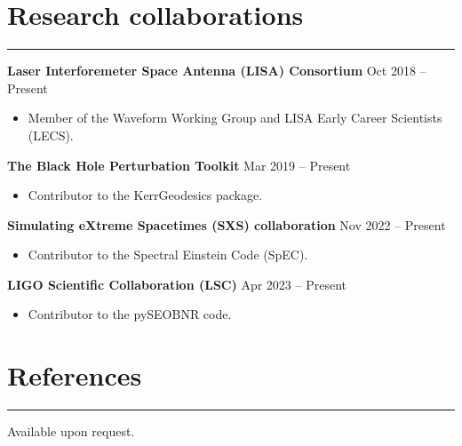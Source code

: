 \documentclass[10.5pt, oneside]{article}   	%
\begin{document}

{\color{Sectioncolour}
\section*{Research collaborations}
\vspace{-3mm}
\noindent\rule{\linewidth}{0.6pt}}
{\bf Laser Interforemeter Space Antenna (LISA) Consortium}  \hfill Oct 2018 -- Present \\
\vspace{-5mm}
\begin{itemize}
\item Member of the Waveform Working Group and LISA Early Career Scientists (LECS).
\end{itemize} 
{\bf The Black Hole Perturbation Toolkit}  \hfill Mar 2019 -- Present \\
\vspace{-5mm}
\begin{itemize}
\item Contributor to the KerrGeodesics package.
\end{itemize}
{\bf Simulating eXtreme Spacetimes (SXS) collaboration}  \hfill Nov 2022 -- Present \\
\vspace{-5mm}
\begin{itemize}
\item Contributor to the Spectral Einstein Code (SpEC).
\end{itemize} 
{\bf LIGO Scientific Collaboration (LSC)}  \hfill Apr 2023 -- Present \\
\vspace{-5mm}
\begin{itemize}
\item Contributor to the pySEOBNR code.
\end{itemize} 

{\color{Sectioncolour}
\section*{References}
\vspace{-3mm}
\noindent\rule{\linewidth}{0.6pt}}
Available upon request.
\end{document}
